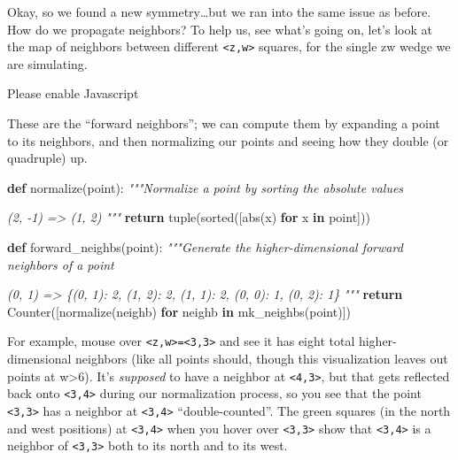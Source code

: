 \documentclass[]{article}
\newenvironment{Shaded}{}{}
\newcommand{\BuiltInTok}[1]{#1}
\newcommand{\CommentTok}[1]{\textcolor[rgb]{0.38,0.63,0.69}{\textit{#1}}}
\newcommand{\ControlFlowTok}[1]{\textcolor[rgb]{0.00,0.44,0.13}{\textbf{#1}}}
\newcommand{\KeywordTok}[1]{\textcolor[rgb]{0.00,0.44,0.13}{\textbf{#1}}}
\newcommand{\NormalTok}[1]{#1}
\begin{document}
Okay, so we found a new symmetry\ldots but we ran into the same issue as before.
How do we propagate neighbors? To help us, see what's going on, let's look at
the map of neighbors between different \texttt{\textless{}z,w\textgreater{}}
squares, for the single zw wedge we are simulating.

\leavevmode\hypertarget{golSyms4DForward}{}%
Please enable Javascript

These are the ``forward neighbors''; we can compute them by expanding a point to
its neighbors, and then normalizing our points and seeing how they double (or
quadruple) up.

\begin{Shaded}
\begin{Highlighting}[]
\KeywordTok{def}\NormalTok{ normalize(point):}
    \CommentTok{"""Normalize a point by sorting the absolute values}

\CommentTok{    (2, {-}1)}
\CommentTok{    => (1, 2)}
\CommentTok{    """}
    \ControlFlowTok{return} \BuiltInTok{tuple}\NormalTok{(}\BuiltInTok{sorted}\NormalTok{([}\BuiltInTok{abs}\NormalTok{(x) }\ControlFlowTok{for}\NormalTok{ x }\KeywordTok{in}\NormalTok{ point]))}

\KeywordTok{def}\NormalTok{ forward\_neighbs(point):}
    \CommentTok{"""Generate the higher{-}dimensional forward neighbors of a point}

\CommentTok{    (0, 1)}
\CommentTok{    => \{(0, 1): 2, (1, 2): 2, (1, 1): 2, (0, 0): 1, (0, 2): 1\}}
\CommentTok{    """}
    \ControlFlowTok{return}\NormalTok{ Counter([normalize(neighb) }\ControlFlowTok{for}\NormalTok{ neighb }\KeywordTok{in}\NormalTok{ mk\_neighbs(point)])}
\end{Highlighting}
\end{Shaded}

For example, mouse over
\texttt{\textless{}z,w\textgreater{}=\textless{}3,3\textgreater{}} and see it
has eight total higher-dimensional neighbors (like all points should, though
this visualization leaves out points at w\textgreater6). It's \emph{supposed} to
have a neighbor at \texttt{\textless{}4,3\textgreater{}}, but that gets
reflected back onto \texttt{\textless{}3,4\textgreater{}} during our
normalization process, so you see that the point
\texttt{\textless{}3,3\textgreater{}} has a neighbor at
\texttt{\textless{}3,4\textgreater{}} ``double-counted''. The green squares (in
the north and west positions) at \texttt{\textless{}3,4\textgreater{}} when you
hover over \texttt{\textless{}3,3\textgreater{}} show that
\texttt{\textless{}3,4\textgreater{}} is a neighbor of
\texttt{\textless{}3,3\textgreater{}} both to its north and to its west.
\end{document}

